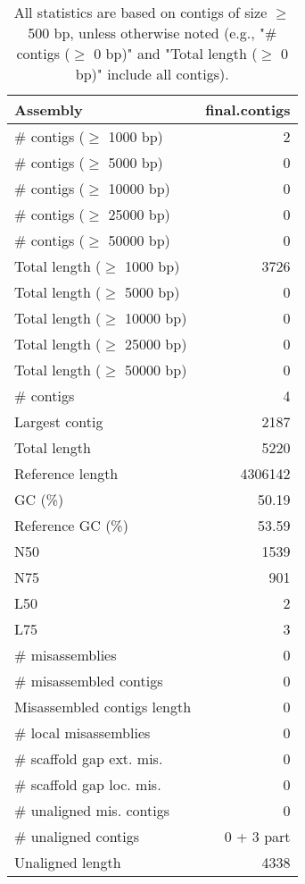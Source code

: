 \documentclass[12pt,a4paper]{article}
\begin{document}
\begin{table}[ht]
\begin{center}
\caption{All statistics are based on contigs of size $\geq$ 500 bp, unless otherwise noted (e.g., "\# contigs ($\geq$ 0 bp)" and "Total length ($\geq$ 0 bp)" include all contigs).}
\begin{tabular}{|l*{1}{|r}|}
\hline
Assembly & final.contigs \\ \hline
\# contigs ($\geq$ 1000 bp) & 2 \\ \hline
\# contigs ($\geq$ 5000 bp) & 0 \\ \hline
\# contigs ($\geq$ 10000 bp) & 0 \\ \hline
\# contigs ($\geq$ 25000 bp) & 0 \\ \hline
\# contigs ($\geq$ 50000 bp) & 0 \\ \hline
Total length ($\geq$ 1000 bp) & 3726 \\ \hline
Total length ($\geq$ 5000 bp) & 0 \\ \hline
Total length ($\geq$ 10000 bp) & 0 \\ \hline
Total length ($\geq$ 25000 bp) & 0 \\ \hline
Total length ($\geq$ 50000 bp) & 0 \\ \hline
\# contigs & 4 \\ \hline
Largest contig & 2187 \\ \hline
Total length & 5220 \\ \hline
Reference length & 4306142 \\ \hline
GC (\%) & 50.19 \\ \hline
Reference GC (\%) & 53.59 \\ \hline
N50 & 1539 \\ \hline
N75 & 901 \\ \hline
L50 & 2 \\ \hline
L75 & 3 \\ \hline
\# misassemblies & 0 \\ \hline
\# misassembled contigs & 0 \\ \hline
Misassembled contigs length & 0 \\ \hline
\# local misassemblies & 0 \\ \hline
\# scaffold gap ext. mis. & 0 \\ \hline
\# scaffold gap loc. mis. & 0 \\ \hline
\# unaligned mis. contigs & 0 \\ \hline
\# unaligned contigs & 0 + 3 part \\ \hline
Unaligned length & 4338 \\ \hline

\end{tabular}
\end{center}
\end{table}
\end{document}
